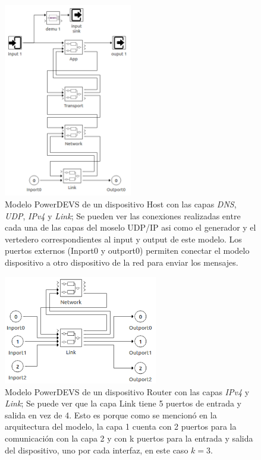 \documentclass[10pt,a4paper]{article}
\begin{document}
\begin{figure}[!htb]
    \centering
    \includegraphics[width = 0.5\textwidth]{img/png/powerdevs/host.png}
    \caption{Modelo PowerDEVS de un dispositivo Host con las capas \textit{DNS}, \textit{UDP}, \textit{IPv4} y \textit{Link}; Se pueden ver las conexiones realizadas entre cada una de las capas del moselo UDP/IP asi como el generador y el vertedero correspondientes al input y output de este modelo. Los puertos externos (Inport0 y outport0) permiten conectar el modelo dispositivo a otro dispositivo de la red para enviar los mensajes.}
    \label{figure: powerdevs host}
\end{figure}

\begin{figure}[!htb]
    \centering
    \includegraphics[width = 0.6\textwidth]{img/png/powerdevs/router.png}
    \caption{Modelo PowerDEVS de un dispositivo Router con las capas \textit{IPv4} y \textit{Link}; Se puede ver que la capa Link tiene 5 puertos de entrada y salida en vez de 4. Esto es porque como se mencionó en la arquitectura del modelo, la capa 1 cuenta con 2 puertos para la comunicación con la capa 2 y con k puertos para la entrada y salida del dispositivo, uno por cada interfaz, en este caso $k = 3$.}
    \label{figure: powerdevs router}
\end{figure}
\end{document}
